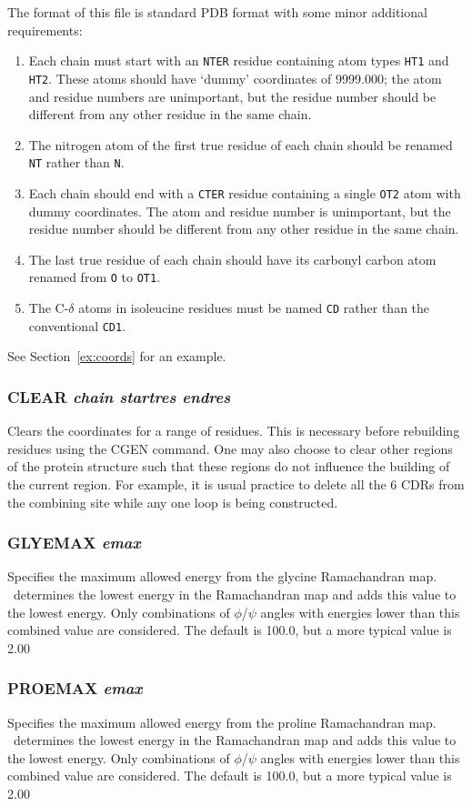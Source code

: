 The format of this file is standard PDB format with some minor additional
requirements:
\begin{enumerate}
\item Each chain must start with an {\tt NTER} residue containing atom types
{\tt HT1} and {\tt HT2}. These atoms should have `dummy' coordinates of
9999.000; the atom and residue numbers are unimportant, but the residue
number should be different from any other residue in the same chain.
\item The nitrogen atom of the first true residue of each chain should be 
renamed {\tt NT} rather than {\tt N}.
\item Each chain should end with a {\tt CTER} residue containing a single
{\tt OT2} atom with dummy coordinates. The atom and residue number is
unimportant, but the residue number should be different from any other
residue in the same chain.
\item The last true residue of each chain should have its carbonyl carbon
atom renamed from {\tt O} to {\tt OT1}.
\item The C-$\delta$ atoms in isoleucine residues must be named {\tt CD}
rather than the conventional {\tt CD1}.
\end{enumerate}
See Section~\ref{ex:coords} for an example.

\subsubsection{CLEAR {\em chain startres endres}}
Clears the coordinates for a range of residues. This is necessary before
rebuilding residues using the CGEN command. One may also choose to clear
other regions of the protein structure such that these regions do not
influence the building of the current region. For example, it is usual
practice to delete all the 6 CDRs from the combining site while any one
loop is being constructed.

\subsubsection{GLYEMAX {\em emax}}
Specifies the maximum allowed energy from the glycine Ramachandran map. 
\cs\ determines
the lowest energy in the Ramachandran map and adds this value to the lowest
energy. Only combinations of $\phi$/$\psi$ angles with energies lower than this
combined value are considered. The default is 100.0, but a more typical 
value is 2.00

\subsubsection{PROEMAX {\em emax}}
Specifies the maximum allowed energy from the proline Ramachandran map. 
\cs\ determines
the lowest energy in the Ramachandran map and adds this value to the lowest
energy. Only combinations of $\phi$/$\psi$ angles with energies lower than this
combined value are considered. The default is 100.0, but a more typical 
value is 2.00

